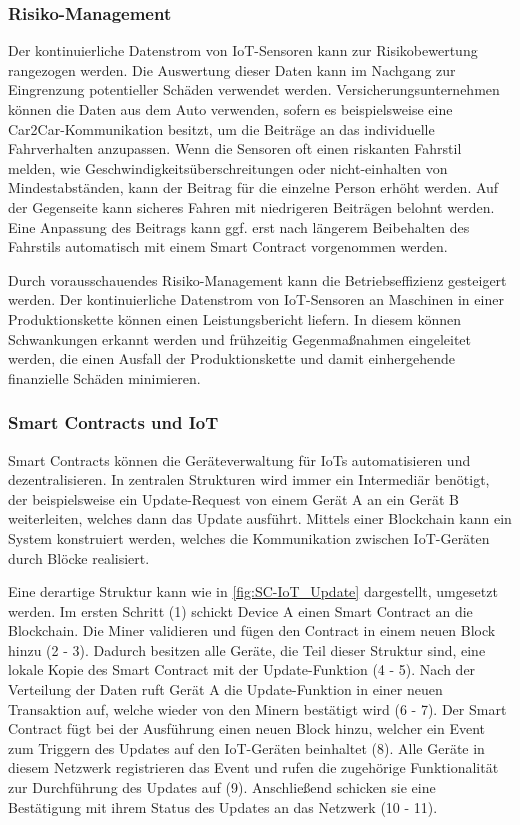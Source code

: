 \subsubsection{Risiko-Management}
Der kontinuierliche Datenstrom von IoT-Sensoren kann zur Risikobewertung rangezogen werden.
Die Auswertung dieser Daten kann im Nachgang zur Eingrenzung potentieller Schäden 
verwendet werden.
Versicherungsunternehmen können die Daten aus dem Auto verwenden, sofern es beispielsweise
eine Car2Car-Kommunikation besitzt, um die Beiträge an das individuelle Fahrverhalten
anzupassen. 
Wenn die Sensoren oft einen riskanten Fahrstil melden, wie Geschwindigkeitsüberschreitungen oder 
nicht-einhalten von Mindestabständen, kann der Beitrag für die einzelne Person erhöht werden. Auf der 
Gegenseite kann sicheres Fahren mit niedrigeren Beiträgen belohnt werden.
\cite[p.~169f]{chowdhary2025smart}
Eine Anpassung des Beitrags kann ggf. erst nach längerem Beibehalten des Fahrstils automatisch mit einem 
Smart Contract vorgenommen werden.

Durch vorausschauendes Risiko-Management kann die Betriebseffizienz gesteigert werden.
Der kontinuierliche Datenstrom von IoT-Sensoren an Maschinen in einer Produktionskette können einen
Leistungsbericht liefern. In diesem können Schwankungen erkannt werden und frühzeitig Gegenmaßnahmen 
eingeleitet werden, die einen Ausfall der Produktionskette und damit einhergehende finanzielle Schäden 
minimieren.
\cite[p.~169]{chowdhary2025smart}





\subsubsection{Smart Contracts und IoT}
Smart Contracts können die Geräteverwaltung für IoTs automatisieren und dezentralisieren. 
In zentralen Strukturen wird immer ein Intermediär benötigt, der beispielsweise ein Update-Request von einem
Gerät A an ein Gerät B weiterleiten, welches dann das Update ausführt.
Mittels einer Blockchain kann ein System konstruiert werden, welches die Kommunikation zwischen IoT-Geräten
durch Blöcke realisiert.

Eine derartige Struktur kann wie in \autoref{fig:SC-IoT_Update} dargestellt, umgesetzt werden.
Im ersten Schritt (1) schickt Device A einen Smart Contract an die Blockchain. Die Miner validieren 
und fügen den Contract in einem neuen Block hinzu (2 - 3). Dadurch besitzen alle Geräte, die Teil dieser 
Struktur sind, eine lokale Kopie des Smart Contract mit der Update-Funktion (4 - 5).
Nach der Verteilung der Daten ruft Gerät A die Update-Funktion in einer neuen Transaktion auf, welche 
wieder von den Minern bestätigt wird (6 - 7). 
Der Smart Contract fügt bei der Ausführung einen neuen Block hinzu, welcher ein Event zum
Triggern des Updates auf den IoT-Geräten beinhaltet (8). 
Alle Geräte in diesem Netzwerk registrieren das Event und rufen die zugehörige Funktionalität zur Durchführung
des Updates auf (9). Anschließend schicken sie eine Bestätigung mit ihrem Status des Updates an das Netzwerk (10 - 11).

